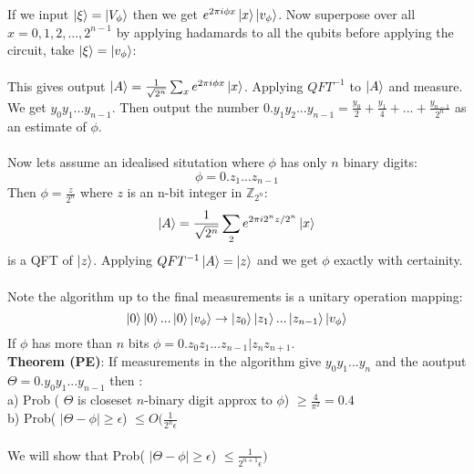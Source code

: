 \documentclass{article}
\begin{document}
               If we input $\ket{\xi} = \ket{ V_{\phi}}$ then we get $e^{2\pi i \phi x} \ket{x} \ket{v_{\phi}}$. Now superpose over all $x = 0,1,2,..., 2^{n-1}$ by applying hadamards to all the qubits before applying the circuit, take $\ket{\xi} = \ket{v_{\phi}}$:
\\\\
This gives output $\ket{A} = \frac{1}{\sqrt{2^n}} \sum_x e^{2\pi i \phi x} \ket{x}$. Applying $QFT^{-1}$ to $\ket{A}$ and measure. We get $y_0 y_1 ... y_{n-1}$. Then output the number $0.y_1y_2...y_{n-1} = \frac{y_0}{2} + \frac{y_1}{4} + ... + \frac{y_{n-1}}{2^{n}}$ as an estimate of $\phi$.\\\\ Now lets assume an idealised situtation where $\phi$ has only $n$ binary digits:
$$
\phi = 0.z_1...z_{n-1}
$$
Then $\phi = \frac{z}{2^n}$ where $z$ is an n-bit integer in $\mathbb{Z}_{2^n}$:
$$
\ket{A} = \frac{1}{\sqrt{2^n}} \sum_2 e^{2\pi i 2^n z/2^n} \ket{x} 
$$
is a QFT of $\ket{z}$. Applying $QFT^{-1} \ket{A} = \ket{z}$ and we get $\phi$ exactly with certainity.\\\\
Note the algorithm up to the final measurements is a unitary operation mapping:
$$
\ket{0} \ket{0} ... \ket{0} \ket{ v_{\phi}} \rightarrow \ket{z_0} \ket{z_1} ... \ket{z_{n-1}} \ket{v_{\phi}}
$$
If $\phi$ has more than $n$ bits $\phi = 0.z_0 z_1... z_{n-1}| z_{n} z_{n+1}$.\\
\textbf{Theorem (PE)}: If measurements in the algorithm give $y_0y_1...y_n$ and the aoutput $\Theta = 0. y_0y_1...y_{n-1}$ then :\\
a) Prob ( $\Theta$ is closeset $n$-binary digit approx to $\phi$) $\geq \frac{4}{\pi^2} = 0.4$\\
b) Prob( $|\Theta - \phi| \geq \epsilon$) $\leq O(\frac{1}{2^n \epsilon}$\\\\
We will show that  Prob( $|\Theta - \phi| \geq \epsilon$) $\leq \frac{1}{2^{n+1} \epsilon})$
\end{document}
